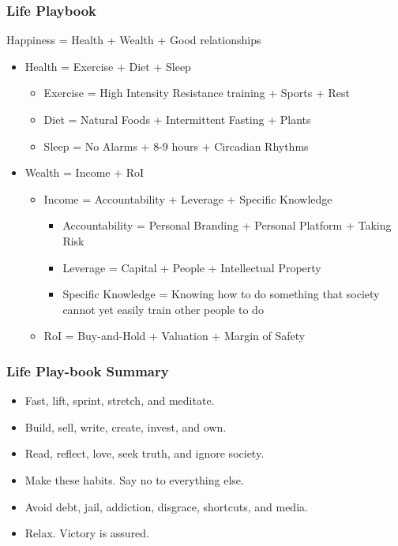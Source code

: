 \begin{frame}[fragile]\frametitle{Life Playbook}

Happiness = Health + Wealth + Good relationships
\begin{itemize}
\item Health = Exercise + Diet + Sleep
		\begin{itemize}
		\item Exercise = High Intensity Resistance training + Sports + Rest
		\item Diet = Natural Foods + Intermittent Fasting + Plants
		\item Sleep = No Alarms + 8-9 hours + Circadian Rhythms
		\end{itemize}

\item Wealth = Income + RoI
		\begin{itemize}
		\item Income = Accountability + Leverage + Specific Knowledge
			\begin{itemize}
			\item Accountability = Personal Branding + Personal Platform + Taking Risk
			\item Leverage = Capital + People + Intellectual Property
			\item Specific Knowledge =  Knowing how to do something that society cannot yet easily train other people to do
			\end{itemize}
		\item RoI = Buy-and-Hold + Valuation + Margin of Safety
		\end{itemize}
\end{itemize}


\end{frame}

\begin{frame}[fragile]\frametitle{Life Play-book Summary}

\begin{itemize}
\item Fast, lift, sprint, stretch, and meditate.
\item Build, sell, write, create, invest, and own.
\item Read, reflect, love, seek truth, and ignore society.
\item Make these habits. Say no to everything else.
\item Avoid debt, jail, addiction, disgrace, shortcuts, and media.
\item Relax. Victory is assured.
\end{itemize}

\end{frame}

